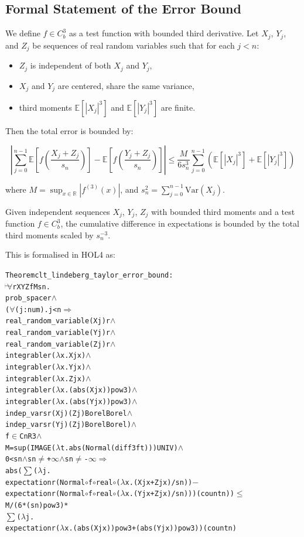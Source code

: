 \subsection{Formal Statement of the Error Bound}

We define $f \in C^3_b$ as a test function with bounded third derivative. Let $X_j$, $Y_j$, and $Z_j$ be sequences of real random variables such that for each $j < n$:
\begin{itemize}
    \item $Z_j$ is independent of both $X_j$ and $Y_j$,
    \item $X_j$ and $Y_j$ are centered, share the same variance,
    \item third moments $\mathbb{E}[|X_j|^3]$ and $\mathbb{E}[|Y_j|^3]$ are finite.
\end{itemize}


Then the total error is bounded by:

\[
\left| \sum_{j=0}^{n-1}
\mathbb{E}\left[f\left(\frac{X_j + Z_j}{s_n} \right)\right] -
\mathbb{E}\left[f\left(\frac{Y_j + Z_j}{s_n} \right)\right]
\right| \leq \frac{M}{6 s_n^3}
\sum_{j=0}^{n-1} \left( \mathbb{E}[|X_j|^3] + \mathbb{E}[|Y_j|^3] \right)
\]

where $M = \sup_{x \in \mathbb{R}} |f^{(3)}(x)|$, and $s_n^2 = \sum_{j=0}^{n-1} \mathrm{Var}(X_j)$.

\begin{theorem}
  \label{thm:taylor-error-bound}
  Given independent sequences $X_j$, $Y_j$, $Z_j$ with bounded third moments and a test function $f \in C^3_b$, the cumulative difference in expectations is bounded by the total third moments scaled by $s_n^{-3}$.
\end{theorem}

This is formalised in HOL4 as:

\begin{hol}
\begin{alltt}
Theorem clt\_lindeberg\_taylor\_error\_bound :
\(\!\!\!{\turn}\!\!\!\!\) \(\forall\)r X Y Z f M s n.
prob\_space r \(\land\)
(\(\forall\)(j :num). j < n \(\Rightarrow\)
  real\_random\_variable (X j) r \(\land\)
  real\_random\_variable (Y j) r \(\land\)
  real\_random\_variable (Z j) r \(\land\)
  integrable r (\(\lambda\)x. X j x) \(\land\)
  integrable r (\(\lambda\)x. Y j x) \(\land\)
  integrable r (\(\lambda\)x. Z j x) \(\land\)
  integrable r (\(\lambda\)x. (abs (X j x)) pow 3) \(\land\)
  integrable r (\(\lambda\)x. (abs (Y j x)) pow 3) \(\land\)
  indep\_vars r (X j) (Z j) Borel Borel \(\land\)
  indep\_vars r (Y j) (Z j) Borel Borel) \(\land\)
f \(\in\) CnR 3 \(\land\)
M = sup (IMAGE (\(\lambda\)t. abs (Normal (diff 3 f t))) UNIV) \(\land\)
0 < s n \(\land\) s n \(\ne\) +\(\infty\) \(\land\) s n \(\ne\) -\(\infty\) \(\Rightarrow\)
abs (\(\sum\) (\(\lambda\)j.
  expectation r (Normal \(\circ\) f \(\circ\) real \(\circ\) (\(\lambda\)x. (X j x + Z j x) / s n)) \({-}\)
  expectation r (Normal \(\circ\) f \(\circ\) real \(\circ\) (\(\lambda\)x. (Y j x + Z j x) / s n))) (count n)) \(\le\)
M / (6 * (s n) pow 3) *
\(\sum\) (\(\lambda\)j.
  expectation r (\(\lambda\)x. (abs (X j x)) pow 3 + (abs (Y j x)) pow 3)) (count n)
\end{alltt}
\end{hol}

